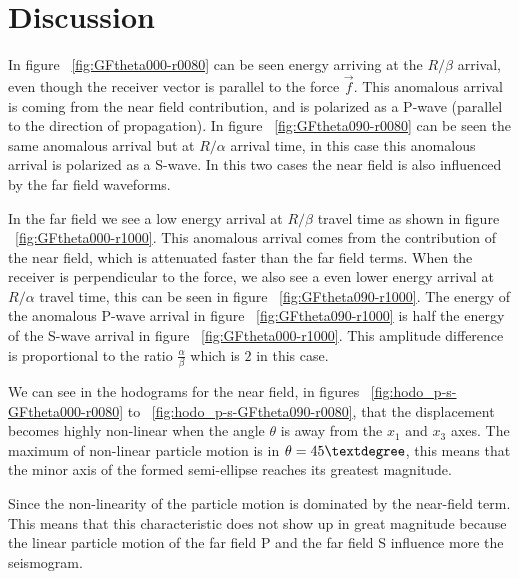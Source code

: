 \section{Discussion}

In figure ~\ref{fig:GFtheta000-r0080} can be seen energy arriving at the $R/\beta$ arrival, even though the receiver vector is parallel
to the force $\vec{f}$. This anomalous arrival is coming from the near field contribution, and is polarized as a P-wave (parallel to the
direction of propagation). In figure ~\ref{fig:GFtheta090-r0080} can be seen the same anomalous arrival but at $R/\alpha$ arrival time, 
in this case this anomalous arrival is polarized as a S-wave. In this two cases the near field is also influenced by the far field waveforms.

In the far field we see a low energy arrival at $R/\beta$ travel time as shown in figure ~\ref{fig:GFtheta000-r1000}. This anomalous
arrival comes from the contribution of the near field, which is attenuated faster than the far field terms. When the receiver is perpendicular
to the force, we also see a even lower energy arrival at $R/\alpha$ travel time, this can be seen in figure ~\ref{fig:GFtheta090-r1000}. 
The energy of the anomalous P-wave arrival in figure ~\ref{fig:GFtheta090-r1000} is half the energy of the S-wave arrival in figure
~\ref{fig:GFtheta000-r1000}. This amplitude difference is proportional to the ratio $\frac{\alpha}{\beta}$ which is $2$ in this case.


We can see in the hodograms for the near field, in figures ~\ref{fig:hodo_p-s-GFtheta000-r0080} to ~\ref{fig:hodo_p-s-GFtheta090-r0080}, 
that the displacement becomes highly non-linear when the angle $\theta$ is away from the $x_1$ and $x_3$ axes. The maximum of non-linear
 particle motion is in $\theta=45\textdegree$, this means that the minor axis of the formed semi-ellipse reaches its greatest magnitude.

Since the non-linearity of the particle motion is dominated by the near-field term. This means that this characteristic does not show up in great 
magnitude because the linear particle motion of the far field P and the far field S influence more the seismogram.





